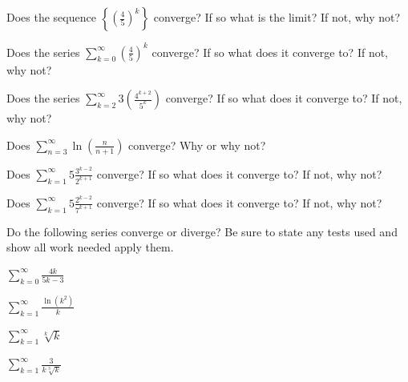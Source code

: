 \documentclass{exam}[12pt]
\begin{document}
\pagestyle{head}

\extraheadheight{.3in}
\extrafootheight{-.3in} 


\vspace{.2in}
\large{
\begin{questions}

\question Does the sequence $\displaystyle
\left\{\left(\frac{4}{5}\right)^k\right\}$ converge?
If so what is the limit?  If not, why not?

\vspace{.2in}
\question Does the series $\displaystyle
\sum_{k=0}^\infty\left(\frac{4}{5}\right)^k$ converge?
If so what does it converge to?  If not, why not?
\vspace{.2in}


\question Does the series $\displaystyle
\sum_{k=2}^\infty 3\left(\frac{4^{k+2}}{5^k}\right)$ converge?
If so what does it converge to?  If not, why not?
\vspace{.2in}

\question Does $\displaystyle
\sum_{n=3}^\infty \ln\left(\frac{n}{n+1}\right)$ converge?
Why or why not?
\vspace{.2in}

\question Does  $\displaystyle
\sum_{k=1}^\infty 5\frac{3^{k-2}}{2^{k+1}} $ converge?
If so what does it converge to?  If not, why not?
\vspace{.2in}

\question Does  $\displaystyle
\sum_{k=1}^\infty 5\frac{2^{k-2}}{7^{k+1}} $ converge?
If so what does it converge to?  If not, why not?

\vspace{.4in}
Do the following series converge or diverge? Be sure to state any
tests used and show all work needed apply them.
\vspace{.2in}

\question $\displaystyle
\sum_{k=0}^\infty \frac{4k}{5k-3} $ 
\vspace{.2in}

\question $\displaystyle
\sum_{k=1}^\infty \frac{\ln(k^2)}{k} $ 
\vspace{.2in}

\question $\displaystyle
\sum_{k=1}^\infty \sqrt[k]{ k} $ 
\vspace{.2in}

\question $\displaystyle
\sum_{k=1}^\infty \frac{3}{k\sqrt[3] k} $ 


\end{questions}

}
\end{document}

